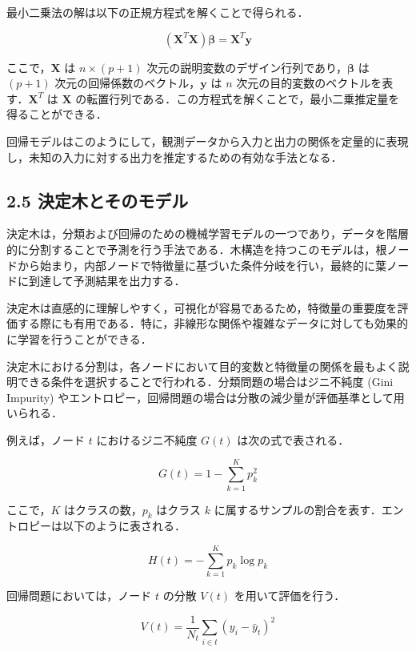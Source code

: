 \begin{itemize}
	最小二乗法の解は以下の正規方程式を解くことで得られる．
	
	\begin{equation}
		(\mathbf{X}^T \mathbf{X}) \mathbf{\beta} = \mathbf{X}^T \mathbf{y}
	\end{equation}
	
	ここで，$\mathbf{X}$ は $n \times (p+1)$ 次元の説明変数のデザイン行列であり，$\mathbf{\beta}$ は $(p+1)$ 次元の回帰係数のベクトル，$\mathbf{y}$ は $n$ 次元の目的変数のベクトルを表す．$\mathbf{X}^T$ は $\mathbf{X}$ の転置行列である．この方程式を解くことで，最小二乗推定量を得ることができる．
	
	回帰モデルはこのようにして，観測データから入力と出力の関係を定量的に表現し，未知の入力に対する出力を推定するための有効な手法となる．
\end{itemize}

\subsection*{2.5 決定木とそのモデル}
決定木は，分類および回帰のための機械学習モデルの一つであり，データを階層的に分割することで予測を行う手法である．木構造を持つこのモデルは，根ノードから始まり，内部ノードで特徴量に基づいた条件分岐を行い，最終的に葉ノードに到達して予測結果を出力する．

決定木は直感的に理解しやすく，可視化が容易であるため，特徴量の重要度を評価する際にも有用である．特に，非線形な関係や複雑なデータに対しても効果的に学習を行うことができる．

決定木における分割は，各ノードにおいて目的変数と特徴量の関係を最もよく説明できる条件を選択することで行われる．分類問題の場合はジニ不純度 (Gini Impurity) やエントロピー，回帰問題の場合は分散の減少量が評価基準として用いられる．

例えば，ノード $t$ におけるジニ不純度 $G(t)$ は次の式で表される．

\begin{equation}
	G(t) = 1 - \sum_{k=1}^{K} p_k^2
\end{equation}

ここで，$K$ はクラスの数，$p_k$ はクラス $k$ に属するサンプルの割合を表す．エントロピーは以下のように表される．

\begin{equation}
	H(t) = - \sum_{k=1}^{K} p_k \log p_k
\end{equation}

回帰問題においては，ノード $t$ の分散 $V(t)$ を用いて評価を行う．

\begin{equation}
	V(t) = \frac{1}{N_t} \sum_{i \in t} (y_i - \bar{y}_t)^2
\end{equation}

